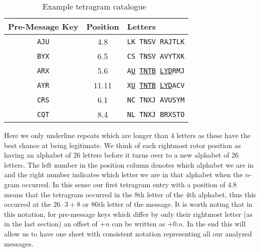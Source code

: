 \begin{table}[h!]
  \centering
  \begin{tabular}{|c|c|l|}
    \hline
    \textbf{Pre-Message Key} & \textbf{Position} & \textbf{Letters}
    \\
    \hline
    \texttt{AJU}             & 4.8               & \texttt{LK TNSV
    RAJTLK}
    \\
    \texttt{BYX}             & 6.5               & \texttt{CS TNSV
    AVYTXK}
    \\
    \texttt{ARX}             & 5.6               &
    \texttt{A}{\uline{\texttt{U}}}\texttt{
    }{\uline{\texttt{T}}}\texttt{}{\uline{\texttt{N}}}\texttt{}{\uline{\texttt{T}}}\texttt{}{\uline{\texttt{B}}}\texttt{
    }{\uline{\texttt{L}}}\texttt{}{\uline{\texttt{Y}}}\texttt{}{\uline{\texttt{D}}}\texttt{RMJ}
    \\
    \texttt{AYR}             & 11.11             &
    \texttt{X}{\uline{\texttt{U}}}\texttt{
    }{\uline{\texttt{T}}}\texttt{}{\uline{\texttt{N}}}\texttt{}{\uline{\texttt{T}}}\texttt{}{\uline{\texttt{B}}}\texttt{
    }{\uline{\texttt{L}}}\texttt{}{\uline{\texttt{Y}}}\texttt{}{\uline{\texttt{D}}}\texttt{ACV}
    \\
    \texttt{CRS}             & 6.1               & \texttt{NC TNXJ
    AVUSYM}
    \\
    \texttt{CQT}             & 8.4               &
    \texttt{}{\texttt{N}}\texttt{L TNXJ BRXSTO}
    \\
    \hline
  \end{tabular}
  \caption{Example tetragram catalogue~\cite[p.~98]{Alexander1945}}
\end{table}
\noindent Here we only underline repeats which are longer than $4$
letters as these have the best chance at being legitimate. We think
of each rightmost rotor position as having an alphabet of 26
letters before it turns over to a new alphabet of 26 letters. The
left number in the position column denotes which alphabet we are in and
the right number indicates which letter we are in that alphabet
when the $n$-gram occurred. In this sense our first tetragram entry
with a position of $4.8$ means that the tetragram occurred in the
$8$th letter of the $4$th alphabet, thus this occurred at the
$26\cdot3 + 8$ or $86$th letter of the message. It is worth noting
that in this notation, for pre-message keys which differ by only
their rightmost letter (as in the last section) an offset of $+n$
can be written as $+0.n$. In the end this will allow us to have one
sheet with consistent notation representing all our analyzed messages.

